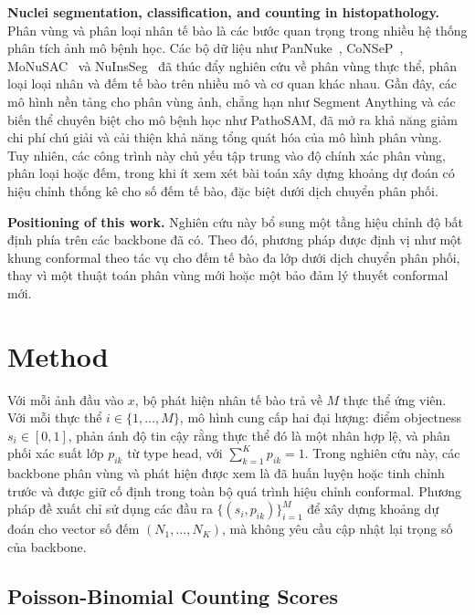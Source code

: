\documentclass[pdflatex,sn-mathphys-num]{sn-jnl}
\begin{document}
\textbf{Nuclei segmentation, classification, and counting in histopathology.}
Phân vùng và phân loại nhân tế bào là các bước quan trọng trong nhiều hệ thống phân
tích ảnh mô bệnh học. Các bộ dữ liệu như PanNuke~\cite{gamper2019pannuke},
CoNSeP~\cite{graham2019hovernet}, MoNuSAC~\cite{verma2021monusac} và
NuInsSeg~\cite{mahbod2024nuinsseg} đã thúc đẩy nghiên cứu về phân vùng thực thể,
phân loại loại nhân và đếm tế bào trên nhiều mô và cơ quan khác nhau. Gần đây, các
mô hình nền tảng cho phân vùng ảnh, chẳng hạn như Segment Anything
và các biến thể chuyên biệt cho mô bệnh học như PathoSAM,
đã mở ra khả năng giảm chi phí chú giải và cải thiện khả năng tổng quát hóa của mô
hình phân vùng. Tuy nhiên, các công trình này chủ yếu tập trung vào độ chính xác phân
vùng, phân loại hoặc đếm, trong khi ít xem xét bài toán xây dựng khoảng dự đoán có
hiệu chỉnh thống kê cho số đếm tế bào, đặc biệt dưới dịch chuyển phân phối.

\textbf{Positioning of this work.}
Nghiên cứu này bổ sung một tầng hiệu chỉnh độ bất định
phía trên các backbone đã có. Theo đó, phương pháp được định vị như một khung conformal
theo tác vụ cho đếm tế bào đa lớp dưới dịch chuyển phân phối, thay vì một thuật toán
phân vùng mới hoặc một bảo đảm lý thuyết conformal mới.

\section{Method}\label{sec:method}

Với mỗi ảnh đầu vào \(x\), bộ phát hiện nhân tế bào trả về \(M\) thực thể ứng viên.
Với mỗi thực thể \(i \in \{1,\dots,M\}\), mô hình cung cấp hai đại lượng: điểm
objectness \(s_i \in [0,1]\), phản ánh độ tin cậy rằng thực thể đó là một nhân hợp lệ,
và phân phối xác suất lớp \(p_{ik}\) từ type head, với
\(\sum_{k=1}^{K} p_{ik}=1\). Trong nghiên cứu này, các backbone phân vùng và phát hiện
được xem là đã huấn luyện hoặc tinh chỉnh trước và được giữ cố định trong toàn bộ
quá trình hiệu chỉnh conformal. Phương pháp đề xuất chỉ sử dụng các đầu ra
\(\{(s_i,p_{ik})\}_{i=1}^{M}\) để xây dựng khoảng dự đoán cho vector số đếm
\((N_1,\dots,N_K)\), mà không yêu cầu cập nhật lại trọng số của backbone.

\subsection{Poisson-Binomial Counting Scores}\label{sec:pb}
\end{document}
